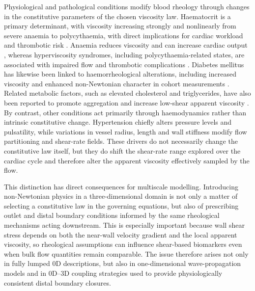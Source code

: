\documentclass[lineno]{jfm}
\begin{document}
Physiological and pathological conditions modify blood rheology through changes in the constitutive parameters of the chosen viscosity law. Haematocrit is a primary determinant, with viscosity increasing strongly and nonlinearly from severe anaemia to polycythaemia, with direct implications for cardiac workload and thrombotic risk \citep{Chien1987,Mozos2015,Nader2019,Isbister1994}. Anaemia reduces viscosity and can increase cardiac output \citep{murray1968circulatory,fowler1975blood}, whereas hyperviscosity syndromes, including polycythaemia-related states, are associated with impaired flow and thrombotic complications \citep{somer1993disorders,kwaan2003hyperviscosity,grenier2024red}. Diabetes mellitus has likewise been linked to haemorrheological alterations, including increased viscosity and enhanced non-Newtonian character in cohort measurements \citep{cho2008hemorheological,barnes1977blood,lowe1980blood,Sun2022}. Related metabolic factors, such as elevated cholesterol and triglycerides, have also been reported to promote aggregation and increase low-shear apparent viscosity \citep{moreno2015effect}. By contrast, other conditions act primarily through haemodynamics rather than intrinsic constitutive change. Hypertension chiefly alters pressure levels and pulsatility, while variations in vessel radius, length and wall stiffness modify flow partitioning and shear-rate fields. These drivers do not necessarily change the constitutive law itself, but they do shift the shear-rate range explored over the cardiac cycle and therefore alter the apparent viscosity effectively sampled by the flow.

This distinction has direct consequences for multiscale modelling. Introducing non-Newtonian physics in a three-dimensional domain is not only a matter of selecting a constitutive law in the governing equations, but also of prescribing outlet and distal boundary conditions informed by the same rheological mechanisms acting downstream. This is especially important because wall shear stress depends on both the near-wall velocity gradient and the local apparent viscosity, so rheological assumptions can influence shear-based biomarkers even when bulk flow quantities remain comparable. The issue therefore arises not only in fully lumped 0D descriptions, but also in one-dimensional wave-propagation models and in 0D--3D coupling strategies used to provide physiologically consistent distal boundary closures.
\end{document}
